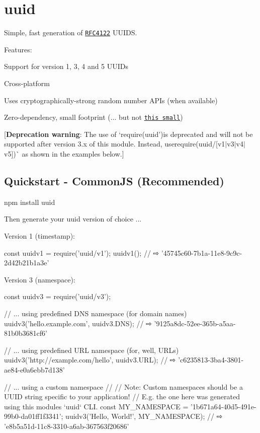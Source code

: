 \section*{uuid \href{http://travis-ci.org/kelektiv/node-uuid}{\tt }}

Simple, fast generation of \href{http://www.ietf.org/rfc/rfc4122.txt}{\tt R\+F\+C4122} U\+U\+I\+DS.

Features\+:


\begin{DoxyItemize}
\item Support for version 1, 3, 4 and 5 U\+U\+I\+Ds
\item Cross-\/platform
\item Uses cryptographically-\/strong random number A\+P\+Is (when available)
\item Zero-\/dependency, small footprint (... but not \href{https://gist.github.com/982883}{\tt this small})
\end{DoxyItemize}

\mbox{[}{\bfseries Deprecation warning}\+: The use of `require(\textquotesingle{}uuid'){\ttfamily is deprecated and will not be supported after version 3.\+x of this module. Instead, use}require(\textquotesingle{}uuid/\mbox{[}v1$\vert$v3$\vert$v4$\vert$v5\mbox{]}\textquotesingle{})\`{} as shown in the examples below.\mbox{]}

\subsection*{Quickstart -\/ Common\+JS (Recommended)}


\begin{DoxyCode}
npm install uuid
\end{DoxyCode}


Then generate your uuid version of choice ...

Version 1 (timestamp)\+:


\begin{DoxyCode}
const uuidv1 = require('uuid/v1');
uuidv1(); // ⇨ '45745c60-7b1a-11e8-9c9c-2d42b21b1a3e'
\end{DoxyCode}


Version 3 (namespace)\+:


\begin{DoxyCode}
const uuidv3 = require('uuid/v3');

// ... using predefined DNS namespace (for domain names)
uuidv3('hello.example.com', uuidv3.DNS); // ⇨ '9125a8dc-52ee-365b-a5aa-81b0b3681cf6'

// ... using predefined URL namespace (for, well, URLs)
uuidv3('http://example.com/hello', uuidv3.URL); // ⇨ 'c6235813-3ba4-3801-ae84-e0a6ebb7d138'

// ... using a custom namespace
//
// Note: Custom namespaces should be a UUID string specific to your application!
// E.g. the one here was generated using this modules `uuid` CLI.
const MY\_NAMESPACE = '1b671a64-40d5-491e-99b0-da01ff1f3341';
uuidv3('Hello, World!', MY\_NAMESPACE); // ⇨ 'e8b5a51d-11c8-3310-a6ab-367563f20686'
\end{DoxyCode}


